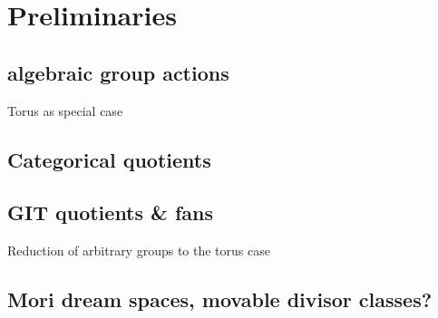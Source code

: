 \chapter{Preliminaries}


\section{algebraic group actions}
Torus as special case

\section{Categorical quotients}

\section{GIT quotients \& fans}
Reduction of arbitrary groups to the torus case


\section{Mori dream spaces, movable divisor classes?}